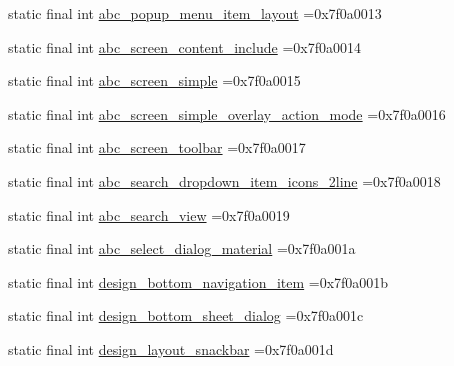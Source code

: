 \begin{DoxyCompactItemize}
\item 
static final int \mbox{\hyperlink{classbr_1_1unb_1_1cic_1_1mp_1_1marketmaster_1_1test_1_1R_1_1layout_a730cafc3e008c65a78d3df0d9cdeb2d8}{abc\+\_\+popup\+\_\+menu\+\_\+item\+\_\+layout}} =0x7f0a0013
\item 
static final int \mbox{\hyperlink{classbr_1_1unb_1_1cic_1_1mp_1_1marketmaster_1_1test_1_1R_1_1layout_ab18a8de58edc7e32fa8c35e6e57303de}{abc\+\_\+screen\+\_\+content\+\_\+include}} =0x7f0a0014
\item 
static final int \mbox{\hyperlink{classbr_1_1unb_1_1cic_1_1mp_1_1marketmaster_1_1test_1_1R_1_1layout_acfa499d7daac3e1e55195c8e362f3dd1}{abc\+\_\+screen\+\_\+simple}} =0x7f0a0015
\item 
static final int \mbox{\hyperlink{classbr_1_1unb_1_1cic_1_1mp_1_1marketmaster_1_1test_1_1R_1_1layout_ade67f94fb76541c74a10b5682080275e}{abc\+\_\+screen\+\_\+simple\+\_\+overlay\+\_\+action\+\_\+mode}} =0x7f0a0016
\item 
static final int \mbox{\hyperlink{classbr_1_1unb_1_1cic_1_1mp_1_1marketmaster_1_1test_1_1R_1_1layout_a5201ac133b4f7fb2e4afb4259286cfa7}{abc\+\_\+screen\+\_\+toolbar}} =0x7f0a0017
\item 
static final int \mbox{\hyperlink{classbr_1_1unb_1_1cic_1_1mp_1_1marketmaster_1_1test_1_1R_1_1layout_ac3553fe3d0db8826ba086b6bfde04b94}{abc\+\_\+search\+\_\+dropdown\+\_\+item\+\_\+icons\+\_\+2line}} =0x7f0a0018
\item 
static final int \mbox{\hyperlink{classbr_1_1unb_1_1cic_1_1mp_1_1marketmaster_1_1test_1_1R_1_1layout_aa2605dda6560709ab97874932d7d7a27}{abc\+\_\+search\+\_\+view}} =0x7f0a0019
\item 
static final int \mbox{\hyperlink{classbr_1_1unb_1_1cic_1_1mp_1_1marketmaster_1_1test_1_1R_1_1layout_a890c2bf25760758c62992200c2b368c9}{abc\+\_\+select\+\_\+dialog\+\_\+material}} =0x7f0a001a
\item 
static final int \mbox{\hyperlink{classbr_1_1unb_1_1cic_1_1mp_1_1marketmaster_1_1test_1_1R_1_1layout_a323fc1f0434e2cffb15e6b8d7a825018}{design\+\_\+bottom\+\_\+navigation\+\_\+item}} =0x7f0a001b
\item 
static final int \mbox{\hyperlink{classbr_1_1unb_1_1cic_1_1mp_1_1marketmaster_1_1test_1_1R_1_1layout_a948bf946de792fc56f2be00779c561d6}{design\+\_\+bottom\+\_\+sheet\+\_\+dialog}} =0x7f0a001c
\item 
static final int \mbox{\hyperlink{classbr_1_1unb_1_1cic_1_1mp_1_1marketmaster_1_1test_1_1R_1_1layout_adf3c250af11a2c19ce6cab3b4d3c7d29}{design\+\_\+layout\+\_\+snackbar}} =0x7f0a001d

\end{DoxyCompactItemize}
